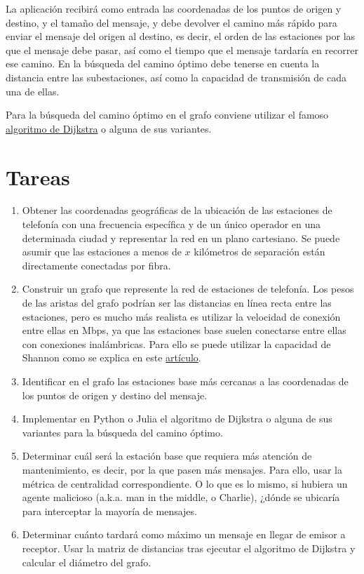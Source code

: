 \documentclass[
  a4paper,
]{scrreport}
\providecommand{\tightlist}{%
  \setlength{\itemsep}{0pt}\setlength{\parskip}{0pt}}\usepackage{longtable,booktabs,array}
\begin{document}
La aplicación recibirá como entrada las coordenadas de los puntos de
origen y destino, y el tamaño del mensaje, y debe devolver el camino más
rápido para enviar el mensaje del origen al destino, es decir, el orden
de las estaciones por las que el mensaje debe pasar, así como el tiempo
que el mensaje tardaría en recorrer ese camino. En la búsqueda del
camino óptimo debe tenerse en cuenta la distancia entre las
subestaciones, así como la capacidad de transmisión de cada una de
ellas.

Para la búsqueda del camino óptimo en el grafo conviene utilizar el
famoso
\href{https://es.wikipedia.org/wiki/Algoritmo_de_Dijkstra}{algoritmo de
Dijkstra} o alguna de sus variantes.

\hypertarget{tareas-1}{%
\section{Tareas}\label{tareas-1}}

\begin{enumerate}
\def\labelenumi{\arabic{enumi}.}
\tightlist
\item
  Obtener las coordenadas geográficas de la ubicación de las estaciones
  de telefonía con una frecuencia específica y de un único operador en
  una determinada ciudad y representar la red en un plano cartesiano. Se
  puede asumir que las estaciones a menos de \(x\) kilómetros de
  separación están directamente conectadas por fibra.
\item
  Construir un grafo que represente la red de estaciones de telefonía.
  Los pesos de las aristas del grafo podrían ser las distancias en línea
  recta entre las estaciones, pero es mucho más realista es utilizar la
  velocidad de conexión entre ellas en Mbps, ya que las estaciones base
  suelen conectarse entre ellas con conexiones inalámbricas. Para ello
  se puede utilizar la capacidad de Shannon como se explica en este
  \href{https://dspace.networks.imdea.org/bitstream/handle/20.500.12761/689/main_Throughput_MiSARN2019_CameraReady_Embedded_CertifiedIEEEeXplore.pdf?sequence=1}{artículo}.
\item
  Identificar en el grafo las estaciones base más cercanas a las
  coordenadas de los puntos de origen y destino del mensaje.
\item
  Implementar en Python o Julia el algoritmo de Dijkstra o alguna de sus
  variantes para la búsqueda del camino óptimo.
\item
  Determinar cuál será la estación base que requiera más atención de
  mantenimiento, es decir, por la que pasen más mensajes. Para ello,
  usar la métrica de centralidad correspondiente. O lo que es lo mismo,
  si hubiera un agente malicioso (a.k.a. man in the middle, o Charlie),
  ¿dónde se ubicaría para interceptar la mayoría de mensajes.
\item
  Determinar cuánto tardará como máximo un mensaje en llegar de emisor a
  receptor. Usar la matriz de distancias tras ejecutar el algoritmo de
  Dijkstra y calcular el diámetro del grafo.
\end{enumerate}
\end{document}
